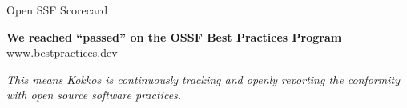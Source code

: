 \begin{frame}[fragile]{Open SSF Scorecard}
\begin{center}
\textbf{We reached ``passed'' on the OSSF Best Practices Program}
\href{https://www.bestpractices.dev/en/projects/9344}{www.bestpractices.dev}

\vspace{0.5cm}
\textit{This means Kokkos is continuously tracking and openly reporting the conformity with open source software practices.}
\end{center}

\end{frame}
